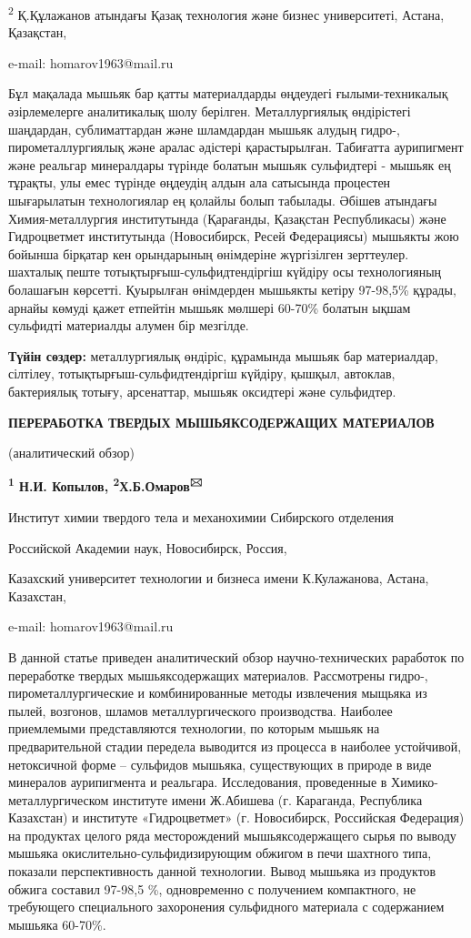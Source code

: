 \textsuperscript{2} Қ.Құлажанов атындағы Қазақ технология және бизнес
университеті, Астана, Қазақстан,

e-mail: homarov1963@mail.ru

Бұл мақалада мышьяк бар қатты материалдарды өңдеудегі ғылыми-техникалық
әзірлемелерге аналитикалық шолу берілген. Металлургиялық өндірістегі
шаңдардан, сублиматтардан және шламдардан мышьяк алудың гидро-,
пирометаллургиялық және аралас әдістері қарастырылған. Табиғатта
аурипигмент және реальгар минералдары түрінде болатын мышьяк сульфидтері
- мышьяк ең тұрақты, улы емес түрінде өңдеудің алдын ала сатысында
процестен шығарылатын технологиялар ең қолайлы болып табылады. Әбішев
атындағы Химия-металлургия институтында (Қарағанды, Қазақстан
Республикасы) және Гидроцветмет институтында (Новосибирск, Ресей
Федерациясы) мышьякты жою бойынша бірқатар кен орындарының өнімдеріне
жүргізілген зерттеулер. шахталық пеште тотықтырғыш-сульфидтендіргіш
күйдіру осы технологияның болашағын көрсетті. Қуырылған өнімдерден
мышьякты кетіру 97-98,5\% құрады, арнайы көмуді қажет етпейтін мышьяк
мөлшері 60-70\% болатын ықшам сульфидті материалды алумен бір мезгілде.

{\bfseries Түйін сөздер:} металлургиялық өндіріс, құрамында мышьяк бар
материалдар, сілтілеу, тотықтырғыш-сульфидтендіргіш күйдіру, қышқыл,
автоклав, бактериялық тотығу, арсенаттар, мышьяк оксидтері және
сульфидтер.

{\bfseries ПЕРЕРАБОТКА ТВЕРДЫХ МЫШЬЯКСОДЕРЖАЩИХ МАТЕРИАЛОВ}

(аналитический обзор)

{\bfseries \textsuperscript{1} Н.И. Копылов,
\textsuperscript{2}Х.Б.Омаров\textsuperscript{🖂 }}

Институт химии твердого тела и механохимии Сибирского отделения

Российской Академии наук, Новосибирск, Россия,

Казахский университет технологии и бизнеса имени К.Кулажанова, Астана,
Казахстан,

e-mail: homarov1963@mail.ru

В данной статье приведен аналитический обзор научно-технических
раработок по переработке твердых мышьяксодержащих материалов.
Рассмотрены гидро-, пирометаллургические и комбинированные методы
извлечения мыщьяка из пылей, возгонов, шламов металлургического
производства. Наиболее приемлемыми представляются технологии, по которым
мышьяк на предварительной стадии передела выводится из процесса в
наиболее устойчивой, нетоксичной форме -- сульфидов мышьяка,
существующих в природе в виде минералов аурипигмента и реальгара.
Исследования, проведенные в Химико-металлургическом институте имени
Ж.Абишева (г. Караганда, Республика Казахстан) и институте
«Гидроцветмет» (г. Новосибирск, Российская Федерация) на продуктах
целого ряда месторождений мышьяксодержащего сырья по выводу мышьяка
окислительно-сульфидизирующим обжигом в печи шахтного типа, показали
перспективность данной технологии. Вывод мышьяка из продуктов обжига
составил 97-98,5 \%, одновременно с получением компактного, не
требующего специального захоронения сульфидного материала с содержанием
мышьяка 60-70\%.

